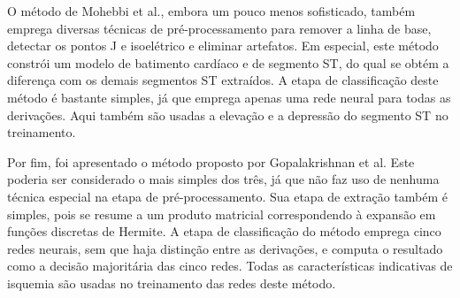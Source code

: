 O método de Mohebbi et al., embora um pouco menos sofisticado, também emprega diversas técnicas de pré-processamento para remover a linha de base, detectar os pontos J e isoelétrico e eliminar artefatos. Em especial, este método constrói um modelo de batimento cardíaco e de segmento ST, do qual se obtém a diferença com os demais segmentos ST extraídos. A etapa de classificação deste método é bastante simples, já que emprega apenas uma rede neural para todas as derivações. Aqui também são usadas a elevação e a depressão do segmento ST no treinamento.

Por fim, foi apresentado o método proposto por Gopalakrishnan et al. Este poderia ser considerado o mais simples dos três, já que não faz uso de nenhuma técnica especial na etapa de pré-processamento. Sua etapa de extração também é simples, pois se resume a um produto matricial correspondendo à expansão em funções discretas de Hermite. A etapa de classificação do método emprega cinco redes neurais, sem que haja distinção entre as derivações, e computa o resultado como a decisão majoritária das cinco redes. Todas as características indicativas de isquemia são usadas no treinamento das redes deste método.
